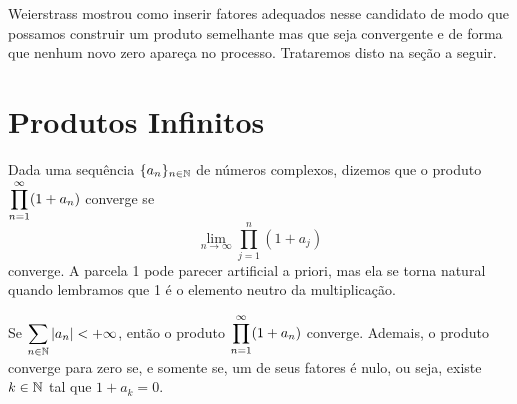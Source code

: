     Weierstrass mostrou como inserir fatores adequados nesse candidato de modo que
    possamos construir um produto semelhante mas que seja convergente e de forma que
    nenhum novo zero apareça no processo. Trataremos disto na seção a seguir.
    
\section{Produtos Infinitos}

    Dada uma sequência $\{ a_n \}_{n\in\mathbb{N}}$ de números complexos, dizemos que o
    produto $\displaystyle{ \prod_{n=1}^{\infty} (1+a_n) }$ converge se
    \begin{equation*}
        \lim_{n\to\infty} \prod_{j=1}^n (1+a_j)
    \end{equation*}
    converge. A parcela 1 pode parecer artificial a priori, mas ela se torna
    natural quando lembramos que 1 é o elemento neutro da multiplicação.
    \begin{proposicao}
    \label{prop:prod-inf}
        Se $\displaystyle{\sum_{n\in\mathbb{N}} |a_n| < +\infty }$, então o produto
        $\displaystyle{ \prod_{n=1}^{\infty} (1+a_n) }$ converge. Ademais, o produto converge
        para zero se, e somente se, um de seus fatores é nulo, ou seja, existe
        $k\in\mathbb{N}$ tal que $1+a_k = 0$.
    \end{proposicao}
